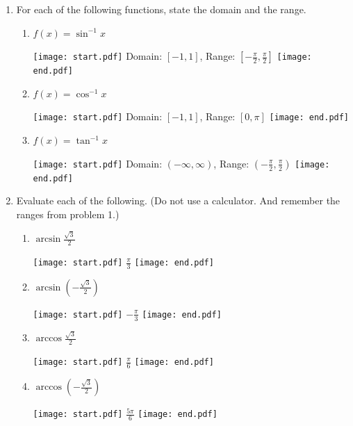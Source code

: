 \documentclass[12pt]{article}
\begin{document}
\begin{enumerate}

\item For each of the following functions, state the domain and the range.

\begin{enumerate}

\item $\displaystyle f(x)=\sin^{-1}{x}$

\texttt{[image: start.pdf]}
{Domain: $[-1,1]$, Range: $\displaystyle \left[-\frac{\pi}{2},\frac{\pi}{2}\right]$}
\texttt{[image: end.pdf]}


\item $\displaystyle f(x)=\cos^{-1}{x}$

\texttt{[image: start.pdf]}
{Domain: $[-1,1]$, Range: $\displaystyle [0,\pi]$}
\texttt{[image: end.pdf]}


\item $\displaystyle f(x)=\tan^{-1}{x}$

\texttt{[image: start.pdf]}
{Domain: $(-\infty,\infty)$, Range: $\displaystyle \left(-\frac{\pi}{2},\frac{\pi}{2}\right)$}
\texttt{[image: end.pdf]}


\end{enumerate}

\item Evaluate each of the following. (Do not use a calculator.  And remember the ranges from problem 1.)

\begin{enumerate}

\item $\displaystyle \arcsin{\frac{\sqrt{3}}{2}}$

\texttt{[image: start.pdf]}
{$\displaystyle \frac{\pi}{3}$}
\texttt{[image: end.pdf]}


\item $\displaystyle \arcsin{\left(-\frac{\sqrt{3}}{2}\right)}$

\texttt{[image: start.pdf]}
{$\displaystyle -\frac{\pi}{3}$}
\texttt{[image: end.pdf]}


\item $\displaystyle \arccos{\frac{\sqrt{3}}{2}}$

\texttt{[image: start.pdf]}
{$\displaystyle \frac{\pi}{6}$}
\texttt{[image: end.pdf]}


\item $\displaystyle \arccos{\left(-\frac{\sqrt{3}}{2}\right)}$

\texttt{[image: start.pdf]}
{$\displaystyle \frac{5\pi}{6}$}
\texttt{[image: end.pdf]}



\end{enumerate}
\end{enumerate}
\end{document}
